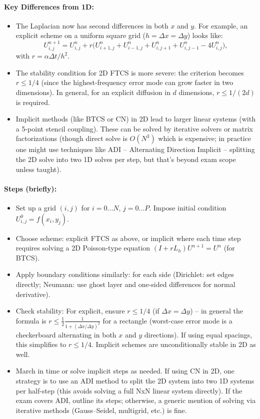 \documentclass[a4paper,11pt]{report}
\begin{document}
\paragraph{Key Differences from 1D:}
\begin{itemize}
    \item The Laplacian now has second differences in both $x$ and $y$. For example, an explicit scheme on a uniform square grid ($h = \Delta x = \Delta y$) looks like:
          $$U_{i,j}^{n+1} = U_{i,j}^n + r \Big(U_{i+1,j}^n + U_{i-1,j}^n + U_{i,j+1}^n + U_{i,j-1}^n - 4U_{i,j}^n\Big),$$
          with $r = \alpha\Delta t/h^2$.
    \item The stability condition for 2D FTCS is more severe: the criterion becomes $r \le 1/4$ (since the highest-frequency error mode can grow faster in two dimensions). In general, for an explicit diffusion in $d$ dimensions, $r \le 1/(2d)$ is required.
    \item Implicit methods (like BTCS or CN) in 2D lead to larger linear systems (with a 5-point stencil coupling). These can be solved by iterative solvers or matrix factorizations (though direct solve is $O(N^3)$ which is expensive; in practice one might use techniques like ADI -- Alternating Direction Implicit -- splitting the 2D solve into two 1D solves per step, but that’s beyond exam scope unless taught).
\end{itemize}

\paragraph{Steps (briefly):}
\begin{itemize}
    \item Set up a grid $(i,j)$ for $i=0...N$, $j=0...P$. Impose initial condition $U_{i,j}^0 = f(x_i,y_j)$.
    \item Choose scheme: explicit FTCS as above, or implicit where each time step requires solving a 2D Poisson-type equation $(I + rL_h)U^{n+1} = U^n$ (for BTCS).
    \item Apply boundary conditions similarly: for each side (Dirichlet: set edges directly; Neumann: use ghost layer and one-sided differences for normal derivative).
    \item Check stability: For explicit, ensure $r \le 1/4$ (if $\Delta x = \Delta y$) -- in general the formula is $r \le \frac{1}{2}\frac{1}{1 + (\Delta x/\Delta y)^2}$ for a rectangle (worst-case error mode is a checkerboard alternating in both $x$ and $y$ directions). If using equal spacings, this simplifies to $r\le 1/4$. Implicit schemes are unconditionally stable in 2D as well.
    \item March in time or solve implicit steps as needed. If using CN in 2D, one strategy is to use an ADI method to split the 2D system into two 1D systems per half-step (this avoids solving a full NxN linear system directly). If the exam covers ADI, outline its steps; otherwise, a generic mention of solving via iterative methods (Gauss--Seidel, multigrid, etc.) is fine.
\end{itemize}
\end{document}
